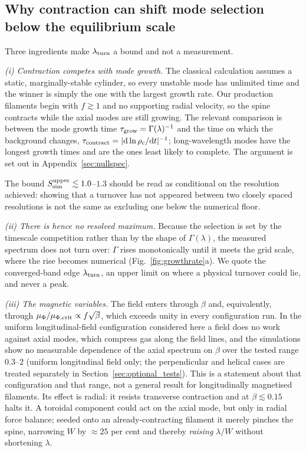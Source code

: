 \documentclass[usenatbib,twoside,twocolumn]{mnras}
\begin{document}
\subsection{Why contraction can shift mode selection below the equilibrium scale}
\label{sec:whyupper}

Three ingredients make $\lambda_{\rm turn}$ a bound  and not a measurement.

\emph{(i) Contraction competes with mode growth.} The classical calculation assumes a static, marginally-stable cylinder, so every unstable mode has unlimited time and the winner is simply the one with the largest growth rate. Our production filaments begin with $f\gtrsim1$ and no supporting radial velocity, so the spine contracts while the axial modes are still growing. The relevant comparison is between the mode growth time $\tau_{\rm grow}=\Gamma(\lambda)^{-1}$ and the time on which the background changes, $\tau_{\rm contract}=|{\rm d}\ln\rho_c/{\rm d}t|^{-1}$; long-wavelength modes have the longest growth times and are the ones least likely to complete. The argument is set out in Appendix~\ref{sec:nullspec}.

The bound $S_{\rm sim}^{\rm upper}\lesssim1.0$--$1.3$ should be read as conditional on the resolution achieved: showing that a turnover has not appeared between two closely spaced resolutions is not the same as excluding one below the numerical floor.

\emph{(ii) There is hence no resolved maximum.} Because the selection is set by the timescale competition rather than by the shape of $\Gamma(\lambda)$, the measured spectrum does not turn over: $\Gamma$ rises monotonically until it meets the grid scale, where the rise becomes numerical (Fig.~\ref{fig:growthrate}a). We quote the converged-band edge $\lambda_{\rm turn}$, an upper limit on where a physical turnover could lie, and never a peak.

\emph{(iii) The magnetic variables.} The field enters through $\beta$ and, equivalently, through $\mu_\Phi/\mu_{\Phi,\rm crit}\propto f\sqrt{\beta}$, which exceeds unity in every configuration run. In the uniform longitudinal-field configuration considered here a field does no work against axial modes, which compress gas along the field lines, and the simulations show no measurable dependence of the axial spectrum on $\beta$ over the tested range $0.3$--$2$ (uniform longitudinal field only; the perpendicular and helical cases are treated separately in Section~\ref{sec:optional_tests}). This is a statement about that configuration and that range, not a general result for longitudinally magnetised filaments. Its effect is radial: it resists transverse contraction and at $\beta\lesssim0.15$ halts it. A toroidal component could act on the axial mode, but only in radial force balance; seeded onto an already-contracting filament it merely pinches the spine, narrowing $W$ by $\approx25$ per cent and thereby \emph{raising} $\lambda/W$ without shortening $\lambda$.
\end{document}
